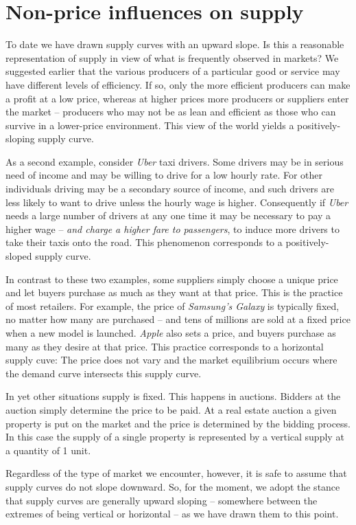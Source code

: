 \section{Non-price influences on supply}\label{sec:ch3sec5}

To date we have drawn supply curves with an upward slope. Is this a
reasonable representation of supply in view of what is frequently observed
in markets? We suggested earlier that the various producers of a particular
good or service may have different levels of efficiency. If so, only the
more efficient producers can make a profit at a low price, whereas at higher
prices more producers or suppliers enter the market -- producers who may not
be as lean and efficient as those who can survive in a lower-price
environment. This view of the world yields a positively-sloping supply curve.

As a second example, consider \textit{Uber} taxi drivers. Some drivers may
be in serious need of income and may be willing to drive for a low hourly
rate. For other individuals driving may be a secondary source of income, and
such drivers are less likely to want to drive unless the hourly wage is
higher. Consequently if \textit{Uber} needs a large number of drivers at any one time
it may be necessary to pay a higher wage -- \textit{and charge a higher fare
to passengers}, to induce more drivers to take their taxis onto the road.
This phenomenon corresponds to a positively-sloped supply curve.

In contrast to these two examples, some suppliers simply choose a unique
price and let buyers purchase as much as they want at that price. This is
the practice of most retailers. For example, the price of \textit{Samsung's
Galaxy} is typically fixed, no matter how many are purchased -- and tens of
millions are sold at a fixed price when a new model is launched. \textit{%
Apple} also sets a price, and buyers purchase as many as they desire at that
price. This practice corresponds to a horizontal supply cuve: The price does
not vary and the market equilibrium occurs where the demand curve intersects
this supply curve.

In yet other situations supply is fixed. This happens in auctions. Bidders
at the auction simply determine the price to be paid. At a real estate
auction a given property is put on the market and the price is determined by
the bidding process. In this case the supply of a single property is
represented by a vertical supply at a quantity of 1 unit.

Regardless of the type of market we encounter, however, it is safe to assume
that supply curves do not slope downward. So, for the moment, we adopt the
stance that supply curves are generally upward sloping -- somewhere between
the extremes of being vertical or horizontal -- as we have drawn them to
this point.


